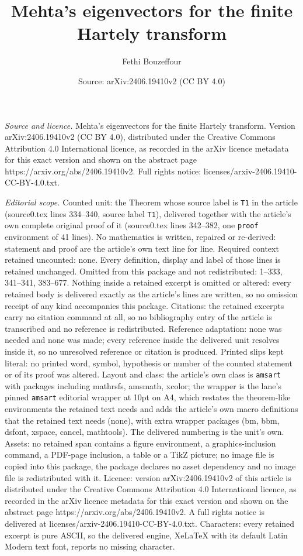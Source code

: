 \documentclass[10pt,a4paper]{amsart}
\title[Mehta's eigenvectors for the finite Hartely transform]{Mehta's eigenvectors for the finite Hartely transform}
\author{Fethi Bouzeffour}
\date{Source: arXiv:2406.19410v2 (CC BY 4.0)}
\begin{document}
\maketitle

\noindent\emph{Source and licence.} Mehta's eigenvectors for the finite Hartely transform. Version arXiv:2406.19410v2 (CC BY 4.0), distributed under the Creative Commons Attribution 4.0 International licence, as recorded in the arXiv licence metadata for this exact version and shown on the abstract page https://arxiv.org/abs/2406.19410v2. Full rights notice: licenses/arxiv-2406.19410-CC-BY-4.0.txt.\par\smallskip

\noindent\textit{Editorial scope.} Counted unit: the Theorem whose source label is \texttt{T1} in the article (source0.tex lines 334--340, source label \texttt{T1}), delivered together with the article's own complete original proof of it (source0.tex lines 342--382, one \texttt{proof} environment of 41 lines). No mathematics is written, repaired or re-derived: statement and proof are the article's own text line for line. Required context retained uncounted: none. Every definition, display and label of those lines is retained unchanged. Omitted from this package and not redistributed: 1--333, 341--341, 383--677. Nothing inside a retained excerpt is omitted or altered: every retained body is delivered exactly as the article's lines are written, so no omission receipt of any kind accompanies this package. Citations: the retained excerpts carry no citation command at all, so no bibliography entry of the article is transcribed and no reference is redistributed. Reference adaptation: none was needed and none was made; every reference inside the delivered unit resolves inside it, so no unresolved reference or citation is produced. Printed slips kept literal: no printed word, symbol, hypothesis or number of the counted statement or of its proof was altered. Layout and class: the article's own class is \texttt{amsart} with packages including mathrsfs, amsmath, xcolor; the wrapper is the lane's pinned \texttt{amsart} editorial wrapper at 10pt on A4, which restates the theorem-like environments the retained text needs and adds the article's own macro definitions that the retained text needs (none), with extra wrapper packages (bm, bbm, dsfont, xspace, cancel, mathtools). The delivered numbering is the unit's own. Assets: no retained span contains a figure environment, a graphics-inclusion command, a PDF-page inclusion, a table or a TikZ picture; no image file is copied into this package, the package declares no asset dependency and no image file is redistributed with it. Licence: version arXiv:2406.19410v2 of this article is distributed under the Creative Commons Attribution 4.0 International licence, as recorded in the arXiv licence metadata for this exact version and shown on the abstract page https://arxiv.org/abs/2406.19410v2. A full rights notice is delivered at licenses/arxiv-2406.19410-CC-BY-4.0.txt. Characters: every retained excerpt is pure ASCII, so the delivered engine, XeLaTeX with its default Latin Modern text font, reports no missing character.
\end{document}
